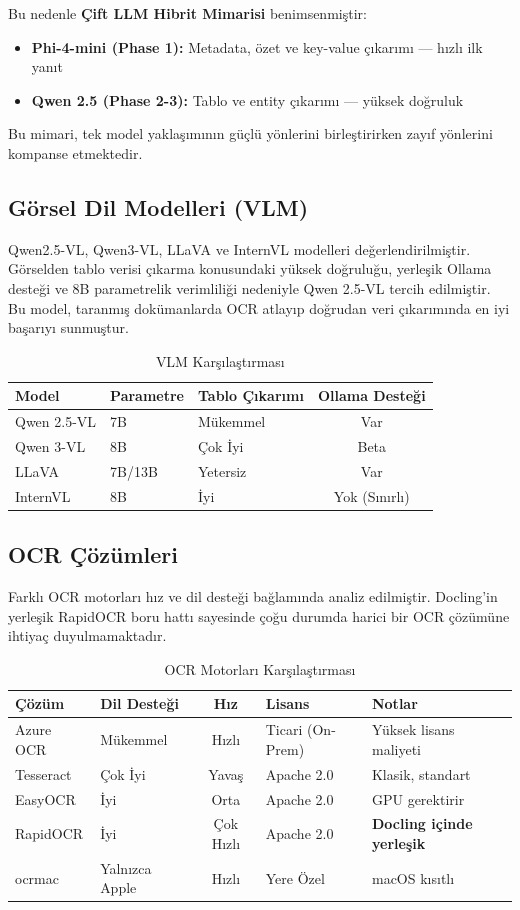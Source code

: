 \documentclass[11pt,a4paper]{article}
\begin{document}
Bu nedenle \textbf{Çift LLM Hibrit Mimarisi} benimsenmiştir:
\begin{itemize}[noitemsep]
\item \textbf{Phi-4-mini (Phase 1):} Metadata, özet ve key-value çıkarımı — hızlı ilk yanıt
\item \textbf{Qwen 2.5 (Phase 2-3):} Tablo ve entity çıkarımı — yüksek doğruluk
\end{itemize}
Bu mimari, tek model yaklaşımının güçlü yönlerini birleştirirken zayıf yönlerini kompanse etmektedir.

\subsection{Görsel Dil Modelleri (VLM)}
Qwen2.5-VL, Qwen3-VL, LLaVA ve InternVL modelleri değerlendirilmiştir. Görselden tablo verisi çıkarma konusundaki yüksek doğruluğu, yerleşik Ollama desteği ve 8B parametrelik verimliliği nedeniyle Qwen 2.5-VL tercih edilmiştir. Bu model, taranmış dokümanlarda OCR atlayıp doğrudan veri çıkarımında en iyi başarıyı sunmuştur.

\begin{table}[H]
\centering
\caption{VLM Karşılaştırması}
\begin{tabular}{lllc}
\toprule
Model & Parametre & Tablo Çıkarımı & Ollama Desteği \\
\midrule
Qwen 2.5-VL & 7B & Mükemmel & Var \\
Qwen 3-VL & 8B & Çok İyi & Beta \\
LLaVA & 7B/13B & Yetersiz & Var \\
InternVL & 8B & İyi & Yok (Sınırlı) \\
\bottomrule
\end{tabular}
\end{table}

\subsection{OCR Çözümleri}
Farklı OCR motorları hız ve dil desteği bağlamında analiz edilmiştir. Docling'in yerleşik RapidOCR boru hattı sayesinde çoğu durumda harici bir OCR çözümüne ihtiyaç duyulmamaktadır.

\begin{table}[H]
\centering
\caption{OCR Motorları Karşılaştırması}
\begin{tabular}{llcll}
\toprule
Çözüm & Dil Desteği & Hız & Lisans & Notlar \\
\midrule
Azure OCR & Mükemmel & Hızlı & Ticari (On-Prem) & Yüksek lisans maliyeti \\
Tesseract & Çok İyi & Yavaş & Apache 2.0 & Klasik, standart \\
EasyOCR & İyi & Orta & Apache 2.0 & GPU gerektirir \\
RapidOCR & İyi & Çok Hızlı & Apache 2.0 & \textbf{Docling içinde yerleşik} \\
ocrmac & Yalnızca Apple & Hızlı & Yere Özel & macOS kısıtlı \\
\bottomrule
\end{tabular}
\end{table}
\end{document}
